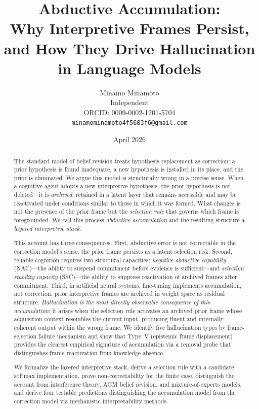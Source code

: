 \documentclass[12pt]{article}
\title{Abductive Accumulation:\\
Why Interpretive Frames Persist,\\
and How They Drive Hallucination in Language Models}
\author{Minamo Minamoto\\
Independent\\
ORCID: 0009-0002-1201-5704\\
\texttt{minamominamoto4f5683f6@gmail.com}}
\date{April 2026}
\begin{document}
\maketitle

\begin{abstract}
The standard model of belief revision treats hypothesis replacement
as correction: a prior hypothesis is found inadequate, a new hypothesis
is installed in its place, and the prior is eliminated.
We argue this model is structurally wrong in a precise sense.
When a cognitive agent adopts a new interpretive hypothesis,
the prior hypothesis is not deleted---it is \emph{archived}:
retained in a latent layer that remains accessible and may be
reactivated under conditions similar to those in which it was formed.
What changes is not the presence of the prior frame but the
\emph{selection rule} that governs which frame is foregrounded.
We call this process \emph{abductive accumulation} and the resulting
structure a \emph{layered interpretive stack}.

This account has three consequences.
First, abductive error is not correctable in the correction model's
sense: the prior frame persists as a latent selection risk.
Second, reliable cognition requires two structural capacities:
\emph{negative abductive capability} (NAC)---the ability to suspend
commitment before evidence is sufficient---and
\emph{selection stability capacity} (SSC)---the ability to suppress
reactivation of archived frames after commitment.
Third, in artificial neural systems, fine-tuning implements
accumulation, not correction: prior interpretive frames are archived
in weight space as residual structure.
\emph{Hallucination is the most directly observable consequence of
this accumulation}: it arises when the selection rule activates an
archived prior frame whose acquisition context resembles the current
input, producing fluent and internally coherent output within the
wrong frame.
We identify five hallucination types by frame-selection failure
mechanism and show that Type~V (epistemic frame displacement)
provides the clearest empirical signature of accumulation via
a removal probe that distinguishes frame reactivation from
knowledge absence.

We formalize the layered interpretive stack, derive a selection rule
with a candidate softmax implementation, prove non-correctability
for the finite case, distinguish the account from interference theory,
AGM belief revision, and mixture-of-experts models, and derive four
testable predictions distinguishing the accumulation model from the
correction model via mechanistic interpretability methods.
\end{abstract}
\end{document}
